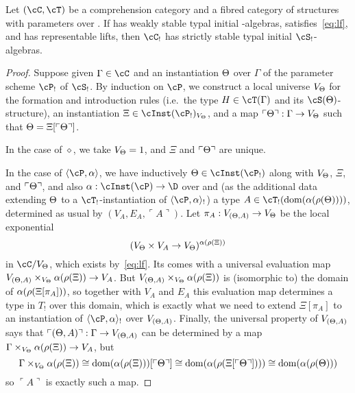 \documentclass[referee]{psp}
\def\name#1{\ulcorner #1\urcorner}
\let\S\cS
\let\P\cP
\def\emptyps{\diamond}
\def\typeps#1#2{\langle #1,#2\rangle}
\let\C\cC
\let\T\cT
\begin{document}
\begin{thm}\label{thm:lu-str-param}
  Let $(\C,\T)$ be a comprehension category and \S a fibred category of structures with parameters over \C.
  If \C has weakly stable typal initial \S-algebras, \C satisfies~\eqref{eq:lf}, and \S has representable lifts, then $\C_!$ has strictly stable typal initial $\S_!$-algebras.
\end{thm}
\begin{proof}
  Suppose given $\Gamma\in\C$ and an instantiation $\Theta$ over $\Gamma$ of the parameter scheme $\P_!$ of $\S_!$.
  By induction on $\P$, we construct a local universe $V_\Theta$ for the formation and introduction rules (i.e.\ the type $H\in\T(\Gamma)$ and its $\S(\Th)$-structure), an instantiation $\Xi\in\cInst(\P_!)_{V_\Th}$, and a map $\name{\Th} : \Gamma\to V_\Th$ such that $\Th = \Xi[\name{\Th}]$.

  In the case of $\emptyps$, we take $V_\Theta = 1$, and $\Xi$ and $\name{\Th}$ are unique.

  In the case of $\typeps{\P}{\al}$, we have inductively $\Th\in\cInst(\P_!)$ along with $V_\Theta$, $\Xi$, and $\name{\Th}$, and also $\al:\cInst(\P)\to\D$ over \C and (as the additional data extending $\Theta$ to a $\T_!$-instantiation of $\typeps{\P}{\al}_!$) a type $A\in\T_!(\mathrm{dom}(\al(\rho(\Th))))$, determined as usual by $(V_A,E_A,\name{A})$.
  Let $\pi_A : V_{(\Theta,A)}\to V_\Theta$ be the local exponential 
  \[ (V_\Theta \times V_A \to V_\Theta)^{\alpha(\rho(\Xi))} \]
  in $\C/V_\Th$, which exists by~\eqref{eq:lf}.
  Its comes with a universal evaluation map $V_{(\Theta,A)} \times_{V_\Theta} \alpha(\rho(\Xi)) \to V_A$.
  But $V_{(\Theta,A)} \times_{V_\Theta} \alpha(\rho(\Xi))$ is (isomorphic to) the domain of $\alpha(\rho(\Xi[\pi_A]))$, so together with $V_A$ and $E_A$ this evaluation map determines a type in $T_!$ over this domain, which is exactly what we need to extend $\Xi[\pi_A]$ to an instantiation of $\typeps{\P}{\al}_!$ over $V_{(\Theta,A)}$.
  Finally, the universal property of $V_{(\Theta,A)}$ says that $\name{(\Th,A)} : \Gamma \to V_{(\Th,A)}$ can be determined by a map $\Gamma \times_{V_\Theta} \alpha(\rho(\Xi)) \to V_A$, but
  \[\Gamma \times_{V_\Th} \al(\rho(\Xi)) \cong \mathrm{dom}(\al(\rho(\Xi)))[\name{\Th}] \cong \mathrm{dom}(\al(\rho(\Xi[\name{\Th}]))) \cong \mathrm{dom}(\al(\rho(\Th)))  \]
  so $\name{A}$ is exactly such a map.


\end{proof}
\end{document}
